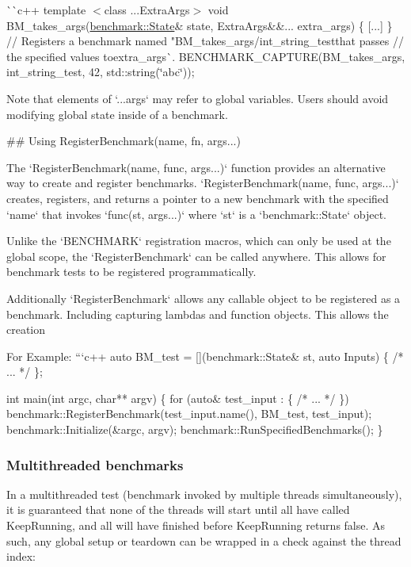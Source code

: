 \`{}\`{}{\ttfamily c++ template $<$class ...Extra\+Args$>$} void B\+M\+\_\+takes\+\_\+args(\mbox{\hyperlink{classbenchmark_1_1_state}{benchmark\+::\+State}}\& state, Extra\+Args\&\&... extra\+\_\+args) \{ \mbox{[}...\mbox{]} \} // Registers a benchmark named "B\+M\+\_\+takes\+\_\+args/int\+\_\+string\+\_\+test{\ttfamily that passes // the specified values to}extra\+\_\+args\`{}. B\+E\+N\+C\+H\+M\+A\+R\+K\+\_\+\+C\+A\+P\+T\+U\+RE(B\+M\+\_\+takes\+\_\+args, int\+\_\+string\+\_\+test, 42, std\+::string(\char`\"{}abc\char`\"{})); 
\begin{DoxyCode}
Note that elements of `...args` may refer to global variables. Users should
avoid modifying global state inside of a benchmark.

## Using RegisterBenchmark(name, fn, args...)

The `RegisterBenchmark(name, func, args...)` function provides an alternative
way to create and register benchmarks.
`RegisterBenchmark(name, func, args...)` creates, registers, and returns a
pointer to a new benchmark with the specified `name` that invokes
`func(st, args...)` where `st` is a `benchmark::State` object.

Unlike the `BENCHMARK` registration macros, which can only be used at the global
scope, the `RegisterBenchmark` can be called anywhere. This allows for
benchmark tests to be registered programmatically.

Additionally `RegisterBenchmark` allows any callable object to be registered
as a benchmark. Including capturing lambdas and function objects. This
allows the creation

For Example:
```c++
auto BM\_test = [](benchmark::State& st, auto Inputs) \{ /* ... */ \};

int main(int argc, char** argv) \{
  for (auto& test\_input : \{ /* ... */ \})
      benchmark::RegisterBenchmark(test\_input.name(), BM\_test, test\_input);
  benchmark::Initialize(&argc, argv);
  benchmark::RunSpecifiedBenchmarks();
\}
\end{DoxyCode}


\subsubsection*{Multithreaded benchmarks}

In a multithreaded test (benchmark invoked by multiple threads simultaneously), it is guaranteed that none of the threads will start until all have called {\ttfamily Keep\+Running}, and all will have finished before Keep\+Running returns false. As such, any global setup or teardown can be wrapped in a check against the thread index\+:


